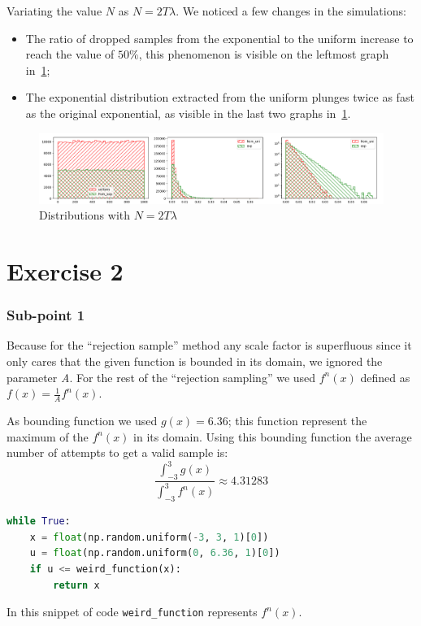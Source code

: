 \documentclass[10pt,a4paper]{article}
\begin{document}
Variating the value \(N\) as \(N=2T\lambda\). We noticed a few changes in the simulations:
\begin{itemize}
\item The ratio of dropped samples from the exponential to the uniform increase to reach the value of \(50\%\), this phenomenon is visible on the leftmost graph in~\ref{fig:3};
\item The exponential distribution extracted from the uniform plunges twice as fast as the original exponential, as visible in the last two graphs in~\ref{fig:3}.
\end{itemize}

\begin{figure}[h]
  \includegraphics[scale=0.4]{es1-3.png}
  \caption{Distributions with \(N=2T\lambda\)}
  \label{fig:3}
\end{figure}

\section*{Exercise 2}

\subsubsection*{Sub-point 1}

Because for the ``rejection sample'' method any scale factor is superfluous since it only cares that the given function is bounded in its domain, we ignored the parameter \emph{A}. For the rest of the ``rejection sampling'' we used \(f^{n}(x)\) defined as \(f(x) = \frac{1}{A}f^{n}(x)\).

As bounding function we used \(g(x) = 6.36\); this function represent the maximum of the \(f^{n}(x)\) in its domain. Using this bounding function the average number of attempts to get a valid sample is:
\begin{equation*}
  \frac{\int^{3}_{-3}{g(x)}}{\int^{3}_{-3}{f^{n}(x)}}\approx4.31283
\end{equation*}

\begin{lstlisting}[language=python]
while True:
    x = float(np.random.uniform(-3, 3, 1)[0])
    u = float(np.random.uniform(0, 6.36, 1)[0])
    if u <= weird_function(x):
        return x
\end{lstlisting}
In this snippet of code \texttt{weird\_function} represents \(f^{n}(x)\).%
\end{document}
